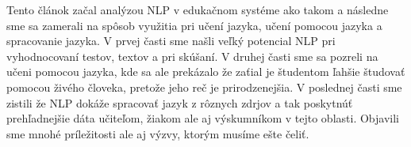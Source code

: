 \documentclass[10pt,slovak,a4paper,twoside]{article}
\begin{document}
	Tento článok začal analýzou NLP v edukačnom systéme ako takom a následne sme sa zamerali na spôsob využitia pri učení jazyka, 
	učení pomocou jazyka a spracovanie jazyka. V prvej časti sme našli veľký potencial NLP pri vyhodnocovaní testov, textov a pri skúšaní.
	V druhej časti sme sa pozreli na učeni pomocou jazyka, kde sa ale prekázalo že zaťial je študentom ľahšie študovať pomocou živého človeka, 
	pretože jeho reč je prirodzenejšia. V poslednej časti sme zistili že NLP dokáže spracovať jazyk z rôznych zdrjov a tak poskytnúť prehľadnejšie dáta
	učiteľom, žiakom ale aj výskumníkom v tejto oblasti. Objavili sme mnohé príležitosti ale aj výzvy, ktorým musíme ešte čeliť.


 
\end{document}
